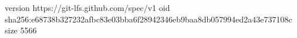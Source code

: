 version https://git-lfs.github.com/spec/v1
oid sha256:e68738b327232afbc83e03bba6f28942346eb9baa8db057994ed2a43e737108c
size 5566
